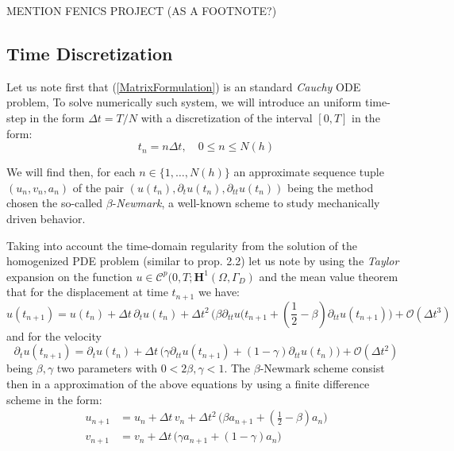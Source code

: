 MENTION FENICS PROJECT (AS A FOOTNOTE?)

\subsection{Time Discretization}
Let us note first that (\ref{MatrixFormulation}) is an standard \textit{Cauchy} ODE problem, To solve numerically such system, we will introduce an uniform time-step in the form $\Delta t = T/N$ with a discretization of the interval $[0, T]$ in the form:
\begin{equation*}
    t_n = n \Delta t, \quad 0 \leq n \leq N(h)
\end{equation*}

We will find then, for each $n \in \{1,\dots, N(h) \}$ an approximate sequence tuple $(u_n, v_n, a_n)$ of the pair $(u(t_n), \partial_{t} u(t_n), \partial_{tt} u(t_n))$ being the method chosen the so-called $\beta$-\textit{Newmark}, a well-known scheme to study mechanically driven behavior. 

Taking into account the time-domain regularity from the solution of the homogenized PDE problem (similar to prop. 2.2) let us note by using the \textit{Taylor} expansion on the function $u \in \mathcal{C}^{p}(0,T;\mathbf{H}^1(\Omega, \Gamma_D)$ and the mean value theorem that for the displacement at time $t_{n+1}$ we have:
\begin{equation*}
    u(t_{n+1}) = u(t_n) + \Delta t \, \partial_{t} u(t_n) + \Delta t^2 \, \big( \beta \partial_{tt} u(t_{n+1} + (\frac{1}{2} - \beta) \partial_{tt} u(t_{n+1}) \big) + \mathcal{O}(\Delta t^3)    
\end{equation*}
and for the velocity
\begin{equation*}
    \partial_{t} u(t_{n+1}) = \partial_{t} u (t_{n}) + \Delta t \, \big( \gamma \partial_{tt} u(t_{n+1}) + (1-\gamma) \partial_{tt} u(t_n) \big) + \mathcal{O}(\Delta t^2)
\end{equation*}
being $\beta, \gamma$ two parameters with $0 < 2\beta, \gamma < 1$.
The $\beta$-Newmark scheme consist then in a approximation of the above equations by using a finite difference scheme in the form:
\begin{align}
    \label{TimeDif-Scheme}
    u_{n+1} &= u_{n} + \Delta t\, v_{n} + \Delta t^2 \, \big( \beta a_{n+1} + (\frac{1}{2} - \beta) a_n \big) \\
    v_{n+1} &= v_n + \Delta t\, \big( \gamma a_{n+1} + (1-\gamma) a_{n} \big)
\end{align}

